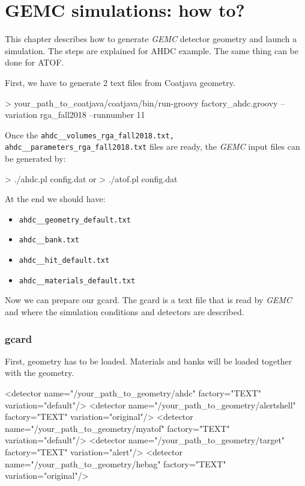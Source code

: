 \pagestyle{headings}
\chapter{GEMC simulations: how to?}
This chapter describes how to generate \textit{GEMC} detector geometry and launch a simulation. The steps are explained for AHDC example. The same thing can be done for ATOF.

First, we have to generate 2 text files from Coatjava geometry. 
\par
\begin{verbbox}[\footnotesize]
> your_path_to_coatjava/coatjava/bin/run-groovy factory_ahdc.groovy --variation rga_fall2018 --runnumber 11
\end{verbbox}
\fbox{\theverbbox}\par

Once the \texttt{ahdc\_\_volumes\_rga\_fall2018.txt, ahdc\_\_parameters\_rga\_fall2018.txt} files are ready, the \textit{GEMC} input files can be generated by:
\par
\begin{verbbox}[\footnotesize]
> ./ahdc.pl config.dat
or
> ./atof.pl config.dat
\end{verbbox}
\fbox{\theverbbox}\par 

At the end we should have:
\begin{itemize}
	\item \texttt{ahdc\_\_geometry\_default.txt}
	\item \texttt{ahdc\_\_bank.txt}
	\item \texttt{ahdc\_\_hit\_default.txt}
	\item \texttt{ahdc\_\_materials\_default.txt}
\end{itemize}

Now we can prepare our gcard. The gcard is a text file that is read by \textit{GEMC} and where the simulation conditions and detectors are described.

	\subsection*{gcard}
	First, geometry has to be loaded. Materials and banks will be loaded together with the geometry.
	\par
	\begin{verbbox}[\footnotesize]
	<detector name="/your_path_to_geometry/ahdc" factory="TEXT" variation="default"/>
	<detector name="/your_path_to_geometry/alertshell" factory="TEXT" variation="original"/>
	<detector name="/your_path_to_geometry/myatof" factory="TEXT" variation="default"/>
	<detector name="/your_path_to_geometry/target" factory="TEXT" variation="alert"/>
	<detector name="/your_path_to_geometry/hebag" factory="TEXT" variation="original"/>
	\end{verbbox}
	\fbox{\theverbbox}\par
	
